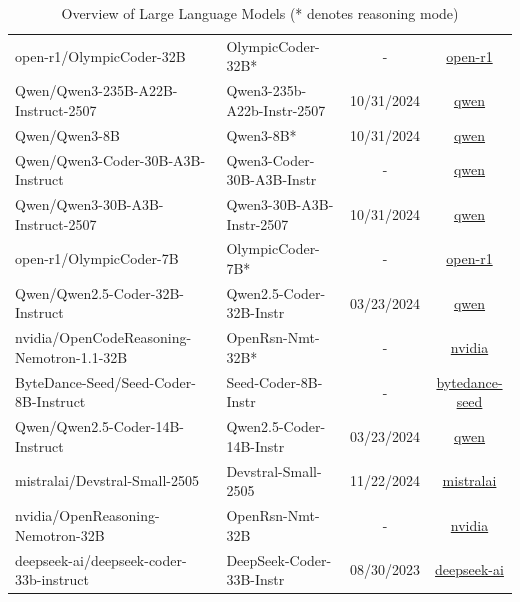 \documentclass{llmxive}
\begin{document}
\begin{table}[hbt]
{\begin{tabular}{*{2}{l} *{2}{c}}
open-r1/OlympicCoder-32B          & OlympicCoder-32B*& - &\href{https://huggingface.co/open-r1/OlympicCoder-32B}{open-r1}\\
\rowcolor{gray!10}
Qwen/Qwen3-235B-A22B-Instruct-2507     & Qwen3-235b-A22b-Instr-2507 & 10/31/2024& \href{https://huggingface.co/Qwen/Qwen3-235B-A22B-Instruct-2507}{qwen} \\
Qwen/Qwen3-8B                  &Qwen3-8B* & 10/31/2024 &\href{https://huggingface.co/Qwen/Qwen3-8B}{qwen}\\
\rowcolor{gray!10}
Qwen/Qwen3-Coder-30B-A3B-Instruct      & Qwen3-Coder-30B-A3B-Instr & - &\href{https://huggingface.co/Qwen/Qwen3-Coder-30B-A3B-Instruct}{qwen} \\
Qwen/Qwen3-30B-A3B-Instruct-2507       & Qwen3-30B-A3B-Instr-2507 & 10/31/2024 & \href{https://huggingface.co/Qwen/Qwen3-30B-A3B-Instruct-2507}{qwen}\\
\rowcolor{gray!10}
open-r1/OlympicCoder-7B           & OlympicCoder-7B* & - &\href{https://huggingface.co/open-r1/OlympicCoder-7B}{open-r1} \\
Qwen/Qwen2.5-Coder-32B-Instruct         & Qwen2.5-Coder-32B-Instr&03/23/2024&\href{https://huggingface.co/Qwen/Qwen2.5-Coder-32B-Instruct}{qwen}\\
\rowcolor{gray!10}
nvidia/OpenCodeReasoning-Nemotron-1.1-32B      &OpenRsn-Nmt-32B* & - & \href{https://huggingface.co/nvidia/OpenCodeReasoning-Nemotron-1.1-32B}{nvidia} \\
ByteDance-Seed/Seed-Coder-8B-Instruct            & Seed-Coder-8B-Instr & - &\href{https://huggingface.co/ByteDance-Seed/Seed-Coder-8B-Instruct}{bytedance-seed}\\
\rowcolor{gray!10}
Qwen/Qwen2.5-Coder-14B-Instruct        & Qwen2.5-Coder-14B-Instr & 03/23/2024 &\href{https://huggingface.co/Qwen/Qwen2.5-Coder-14B-Instruct}{qwen}  \\
mistralai/Devstral-Small-2505            & Devstral-Small-2505 & 11/22/2024 & \href{https://huggingface.co/mistralai/Devstral-Small-2505}{mistralai} \\
\rowcolor{gray!10}
nvidia/OpenReasoning-Nemotron-32B & OpenRsn-Nmt-32B & -&\href{https://huggingface.co/nvidia/OpenReasoning-Nemotron-32B}{nvidia}\\
deepseek-ai/deepseek-coder-33b-instruct       &  DeepSeek-Coder-33B-Instr & 08/30/2023 & \href{https://huggingface.co/deepseek-ai/deepseek-coder-33b-instruct}{deepseek-ai} \\
\bottomrule
\end{tabular}%
}
\caption{Overview of Large Language Models (* denotes reasoning mode)}
\label{tab_model_details}
\end{table}
\end{document}
